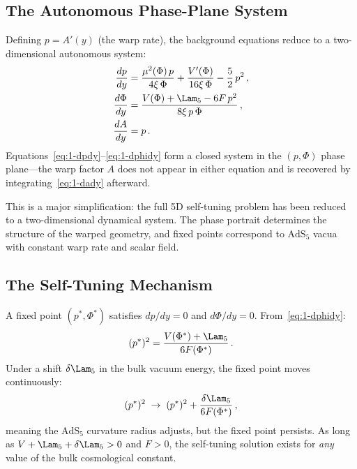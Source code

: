 \subsection{The Autonomous Phase-Plane System}
\label{sec:1-phase-plane}

Defining $p = A'(y)$ (the warp rate), the background equations reduce to a two-dimensional autonomous system:
\begin{align}
\frac{dp}{dy} &= \frac{\mu^2(\Phi)\, p}{4\xi\,\Phi} + \frac{V'(\Phi)}{16\xi\,\Phi} - \frac{5}{2}\,p^2\,, \label{eq:1-dpdy}\\
\frac{d\Phi}{dy} &= \frac{V(\Phi) + \Lam_5 - 6F\, p^2}{8\xi\, p\,\Phi}\,, \label{eq:1-dphidy}\\
\frac{dA}{dy} &= p\,. \label{eq:1-dady}
\end{align}
Equations~\eqref{eq:1-dpdy}--\eqref{eq:1-dphidy} form a closed system in the $(p, \Phi)$ phase plane---the warp factor $A$ does not appear in either equation and is recovered by integrating~\eqref{eq:1-dady} afterward.

This is a major simplification: the full 5D self-tuning problem has been reduced to a two-dimensional dynamical system. The phase portrait determines the structure of the warped geometry, and fixed points correspond to $\mathrm{AdS}_5$ vacua with constant warp rate and scalar field.

\subsection{The Self-Tuning Mechanism}
\label{sec:1-mechanism}

A fixed point $(p^*, \Phi^*)$ satisfies $dp/dy = 0$ and $d\Phi/dy = 0$. From~\eqref{eq:1-dphidy}:
\begin{equation}
\label{eq:1-fixed-point}
(p^*)^2 = \frac{V(\Phi^*) + \Lam_5}{6F(\Phi^*)}\,.
\end{equation}
Under a shift $\delta\Lam_5$ in the bulk vacuum energy, the fixed point moves continuously:
\begin{equation}
\label{eq:1-shift}
(p^*)^2 \;\to\; (p^*)^2 + \frac{\delta\Lam_5}{6F(\Phi^*)}\,,
\end{equation}
meaning the $\mathrm{AdS}_5$ curvature radius adjusts, but the fixed point persists. As long as $V + \Lam_5 + \delta\Lam_5 > 0$ and $F > 0$, the self-tuning solution exists for \emph{any} value of the bulk cosmological constant.

